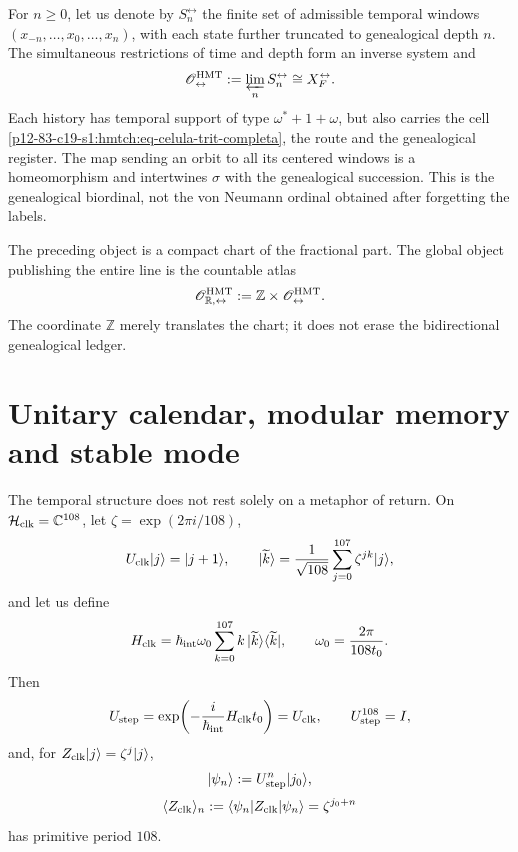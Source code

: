 For \(n\geq0\), let us denote by \(S_n^{\leftrightarrow}\) the finite set
of admissible temporal windows
\((x_{-n},\ldots,x_0,\ldots,x_n)\), with each state further truncated to
genealogical depth \(n\). The simultaneous restrictions of time and
depth form an
inverse system and
\begin{equation}
\mathscr O_{\leftrightarrow}^{\rm HMT}
 :=\varprojlim_n S_n^{\leftrightarrow}
 \cong X_F^{\leftrightarrow}.
 \label{p12-83-c19-s1:hmtch:eq-biordinal-genealogico}
\end{equation}
Each history has temporal support of type
\(\omega^*+1+\omega\), but also carries the cell
\eqref{p12-83-c19-s1:hmtch:eq-celula-trit-completa}, the route and the genealogical register. The map sending an orbit to all its centered windows is a homeomorphism and intertwines \(\sigma\) with the genealogical succession. This is the genealogical biordinal, not the von Neumann ordinal obtained after forgetting the labels.

The preceding object is a compact chart of the fractional part. The global
object publishing the entire line is the countable atlas
\begin{equation}
 \mathscr O_{\mathbb R,\leftrightarrow}^{\rm HMT}
 :=\mathbb Z\times\mathscr O_{\leftrightarrow}^{\rm HMT}.
 \label{p12-83-c19-s1:hmtch:eq-biordinal-global}
\end{equation}
The coordinate \(\mathbb Z\) merely translates the chart; it does not erase the bidirectional
genealogical ledger.

\section{Unitary calendar, modular memory and stable mode}

The temporal structure does not rest solely on a metaphor of return.
On
\(\mathcal H_{\rm clk}=\mathbb C^{108}\), let
\(\zeta=\exp(2\pi i/108)\),
\[
 U_{\rm clk}|j\rangle=|j+1\rangle,
 \qquad
 |\widetilde k\rangle
 =\frac1{\sqrt{108}}\sum_{j=0}^{107}\zeta^{jk}|j\rangle,
\]
and let us define
\begin{equation}
 H_{\rm clk}
 =\hbar_{\rm int}\omega_0
 \sum_{k=0}^{107}k\,|\widetilde k\rangle\langle\widetilde k|,
 \qquad
 \omega_0=\frac{2\pi}{108t_0}.
 \label{p12-83-c19-s1:hmtch:eq-hamiltoniano-reloj}
\end{equation}
Then
\begin{equation}
 U_{\rm step}
 =\exp\!\left(-\frac{i}{\hbar_{\rm int}}H_{\rm clk}t_0\right)
 =U_{\rm clk},
 \qquad U_{\rm step}^{108}=I,
 \label{p12-83-c19-s1:hmtch:eq-propagador-reloj}
\end{equation}
and, for \(Z_{\rm clk}|j\rangle=\zeta^j|j\rangle\),
\[
 |\psi_n\rangle:=U_{\rm step}^n|j_0\rangle,
\]
\begin{equation}
 \langle Z_{\rm clk}\rangle_n
 :=\langle\psi_n|Z_{\rm clk}|\psi_n\rangle
 =\zeta^{j_0+n}
 \label{p12-83-c19-s1:hmtch:eq-respuesta-primitiva-108}
\end{equation}
has primitive period \(108\).

